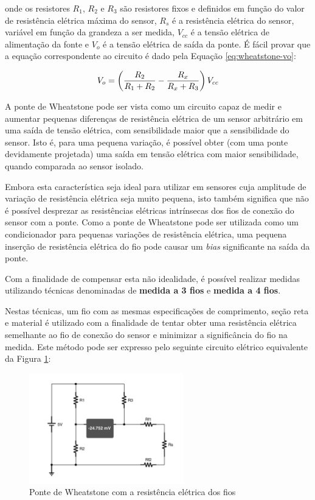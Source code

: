 \documentclass[a4paper]{instrumentacao}
\begin{document}
\noindent onde os resistores $R_1$, $R_2$ e $R_3$ são resistores fixos e definidos em função do valor de resistência elétrica máxima do sensor, $R_s$ é a resistência elétrica do sensor, variável em função da grandeza a ser medida, $V_{cc}$ é a tensão elétrica de alimentação da fonte e $V_o$ é a tensão elétrica de saída da ponte. É fácil provar que a equação correspondente ao circuito é dado pela Equação \ref{eq:wheatstone-vo}:

\begin{equation}
	V_o = \left({{R_2}\over{R_1 + R_2}} - {{R_x}\over{R_x + R_3}}\right)V_{cc}
	\label{eq:wheatstone-vo}
\end{equation}

A ponte de Wheatstone pode ser vista como um circuito capaz de medir e aumentar pequenas diferenças de resistência elétrica de um sensor arbitrário em uma saída de tensão elétrica, com sensibilidade maior que a sensibilidade do sensor. Isto é, para uma pequena variação, é possível obter (com uma ponte devidamente projetada) uma saída em tensão elétrica com maior sensibilidade, quando comparada ao sensor isolado.

Embora esta característica seja ideal para utilizar em sensores cuja amplitude de variação de resistência elétrica seja muito pequena, isto também significa que não é possível desprezar as resistências elétricas intrínsecas dos fios de conexão do sensor com a ponte. Como a ponte de Wheatstone pode ser utilizada como um condicionador para pequenas variações de resistência elétrica, uma pequena inserção de resistência elétrica do fio pode causar um \textit{bias} significante na saída da ponte.

Com a finalidade de compensar esta não idealidade, é possível realizar medidas utilizando técnicas denominadas de \textbf{medida a 3 fios} e \textbf{medida a 4 fios}.

Nestas técnicas, um fio com as mesmas especificações de comprimento, seção reta e material é utilizado com a finalidade de tentar obter uma resistência elétrica semelhante ao fio de conexão do sensor e minimizar a significância do fio na medida. Este método pode ser expresso pelo seguinte circuito elétrico equivalente da Figura \ref{fig:wheatstone-wire-model}:

\begin{figure}[H]
\centering
\includegraphics[width=0.6\textwidth]{Wheatstone-Bridge-WiresModel.pdf}
\caption{Ponte de Wheatstone com a resistência elétrica dos fios}
\label{fig:wheatstone-wire-model}
\end{figure}
\end{document}
